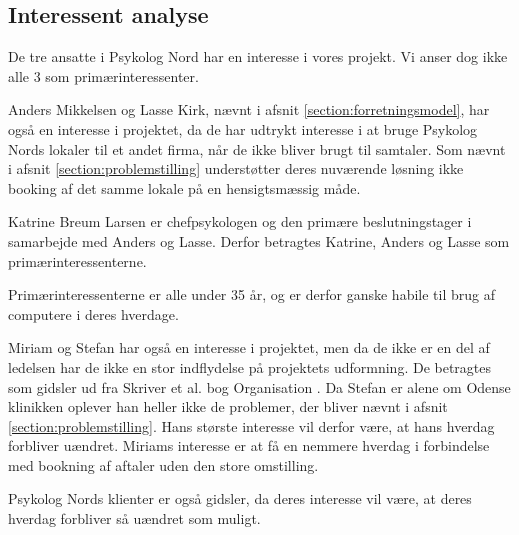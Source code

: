 \subsection{Interessent analyse}

De tre ansatte i Psykolog Nord har en interesse i vores projekt. Vi anser dog ikke alle 3 som primærinteressenter.

Anders Mikkelsen og Lasse Kirk, nævnt i afsnit \ref{section:forretningsmodel}, har også en interesse i projektet, da de har udtrykt interesse i at bruge Psykolog Nords lokaler til et andet firma, når de ikke bliver brugt til samtaler.
Som nævnt i afsnit \ref{section:problemstilling} understøtter deres nuværende løsning ikke booking af det samme lokale på en hensigtsmæssig måde.

Katrine Breum Larsen er chefpsykologen og den primære beslutningstager i samarbejde med Anders og Lasse.
Derfor betragtes Katrine, Anders og Lasse som primærinteressenterne.

Primærinteressenterne er alle under 35 år, og er derfor ganske habile til brug af computere i deres hverdage.

Miriam og Stefan har også en interesse i projektet, men da de ikke er en del af ledelsen har de ikke en stor indflydelse på projektets udformning.
De betragtes som gidsler ud fra Skriver et al. bog Organisation \cite[s. 435]{interessentanalyse}.
Da Stefan er alene om Odense klinikken oplever han heller ikke de problemer, der bliver nævnt i afsnit \ref{section:problemstilling}.
Hans største interesse vil derfor være, at hans hverdag forbliver uændret.
Miriams interesse er at få en nemmere hverdag i forbindelse med bookning af aftaler uden den store omstilling.

Psykolog Nords klienter er også gidsler, da deres interesse vil være, at deres hverdag forbliver så uændret som muligt.